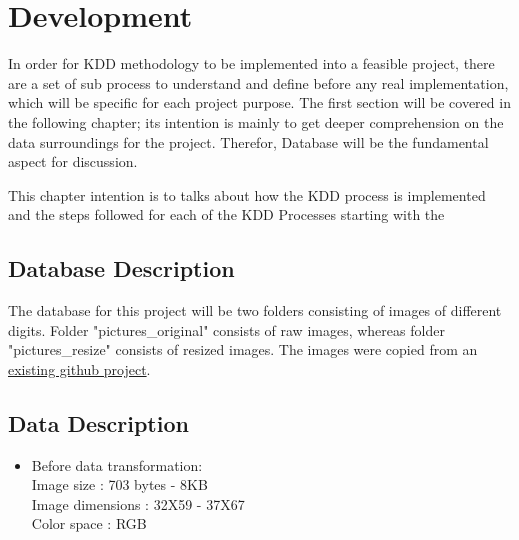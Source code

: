 %
%
%
%

\graphicspath{ {./images/} }

\chapter{Development}
In order for KDD methodology to be implemented into a feasible project, there are a set of sub process to understand and define before any real implementation, which will be specific for each project purpose. The first section will be covered in the following chapter; its intention is mainly to get deeper comprehension on the data surroundings for the project. Therefor, Database will be the fundamental aspect for discussion.


This chapter intention is to talks about how the KDD process is implemented and the steps followed
for each of the KDD Processes starting with the 

\section{Database Description}
The database for this project will be two folders consisting of images of different digits. Folder "pictures\_original" consists of raw images, whereas folder "pictures\_resize" consists of resized images. The images were copied from an \href{https://github.com/jomjol/ctmake-KI-ESP32-Teil2}{existing github project}. 

\section{Data Description }
\begin{itemize}
	\item Before data transformation:\\
	Image size : 703 bytes - 8KB\\
	Image dimensions : 32X59 - 37X67\\
	Color space : RGB
\end{itemize}

